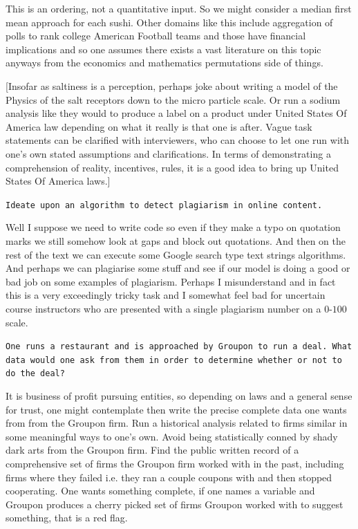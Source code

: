This is an ordering, not a quantitative input. So we might consider a median first mean approach for each sushi. Other domains like this include aggregation of polls to rank college American Football teams and those have financial implications and so one assumes there exists a vast literature on this topic anyways from the economics and mathematics permutations side of things.

[Insofar as saltiness is a perception, perhaps joke about writing a model of the Physics of the salt receptors down to the micro particle scale. Or run a sodium analysis like they would to produce a label on a product under United States Of America law depending on what it really is that one is after. Vague task statements can be clarified with interviewers, who can choose to let one run with one's own stated assumptions and clarifications. In terms of demonstrating a comprehension of reality, incentives, rules, it is a good idea to bring up United States Of America laws.]

\texttt{Ideate upon an algorithm to detect plagiarism in online content.}

Well I suppose we need to write code so even if they make a typo on quotation marks we still somehow look at gaps and block out quotations. And then on the rest of the text we can execute some Google search type text strings algorithms. And perhaps we can plagiarise some stuff and see if our model is doing a good or bad job on some examples of plagiarism. Perhaps I misunderstand and in fact this is a very exceedingly tricky task and I somewhat feel bad for uncertain course instructors who are presented with a single plagiarism number on a $0$-$100$ scale.

\texttt{One runs a restaurant and is approached by Groupon to run a deal. What data would one ask from them in order to determine whether or not to do the deal?}

It is business of profit pursuing entities, so depending on laws and a general sense for trust, one might contemplate then write the precise complete data one wants from from the Groupon firm. Run a historical analysis related to firms similar in some meaningful ways to one's own. Avoid being statistically conned by shady dark arts from the Groupon firm. Find the public written record of a comprehensive set of firms the Groupon firm worked with in the past, including firms where they failed i.e. they ran a couple coupons with and then stopped cooperating. One wants something complete, if one names a variable and Groupon produces a cherry picked set of firms Groupon worked with to suggest something, that is a red flag.

